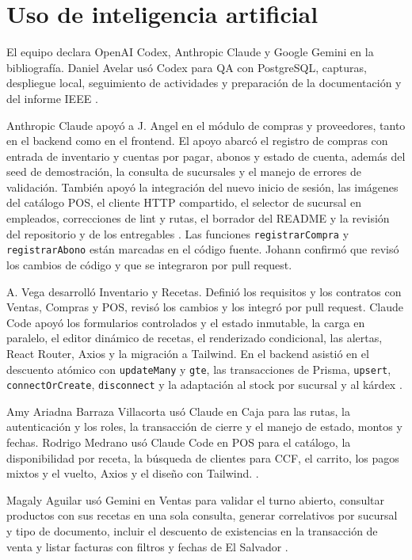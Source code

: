 \documentclass[conference,letterpaper]{IEEEtran}
\begin{document}
\section*{Uso de inteligencia artificial}
El equipo declara OpenAI Codex, Anthropic Claude y Google Gemini en la bibliografía. Daniel Avelar usó Codex para QA con PostgreSQL, capturas, despliegue local, seguimiento de actividades y preparación de la documentación y del informe IEEE \cite{codex}.

Anthropic Claude apoyó a J. Angel en el módulo de compras y proveedores, tanto en el backend como en el frontend. El apoyo abarcó el registro de compras con entrada de inventario y cuentas por pagar, abonos y estado de cuenta, además del seed de demostración, la consulta de sucursales y el manejo de errores de validación. También apoyó la integración del nuevo inicio de sesión, las imágenes del catálogo POS, el cliente HTTP compartido, el selector de sucursal en empleados, correcciones de lint y rutas, el borrador del README y la revisión del repositorio y de los entregables \cite{claude}. Las funciones \texttt{registrarCompra} y \texttt{registrarAbono} están marcadas en el código fuente. Johann confirmó que revisó los cambios de código y que se integraron por pull request.

A. Vega desarrolló Inventario y Recetas. Definió los requisitos y los contratos con Ventas, Compras y POS, revisó los cambios y los integró por pull request. Claude Code apoyó los formularios controlados y el estado inmutable, la carga en paralelo, el editor dinámico de recetas, el renderizado condicional, las alertas, React Router, Axios y la migración a Tailwind. En el backend asistió en el descuento atómico con \texttt{updateMany} y \texttt{gte}, las transacciones de Prisma, \texttt{upsert}, \texttt{connectOrCreate}, \texttt{disconnect} y la adaptación al stock por sucursal y al kárdex \cite{claude}.

Amy Ariadna Barraza Villacorta usó Claude en Caja para las rutas, la autenticación y los roles, la transacción de cierre y el manejo de estado, montos y fechas. Rodrigo Medrano usó Claude Code en POS para el catálogo, la disponibilidad por receta, la búsqueda de clientes para CCF, el carrito, los pagos mixtos y el vuelto, Axios y el diseño con Tailwind. \cite{claude}.

Magaly Aguilar usó Gemini en Ventas para validar el turno abierto, consultar productos con sus recetas en una sola consulta, generar correlativos por sucursal y tipo de documento, incluir el descuento de existencias en la transacción de venta y listar facturas con filtros y fechas de El Salvador \cite{gemini}.
\end{document}

